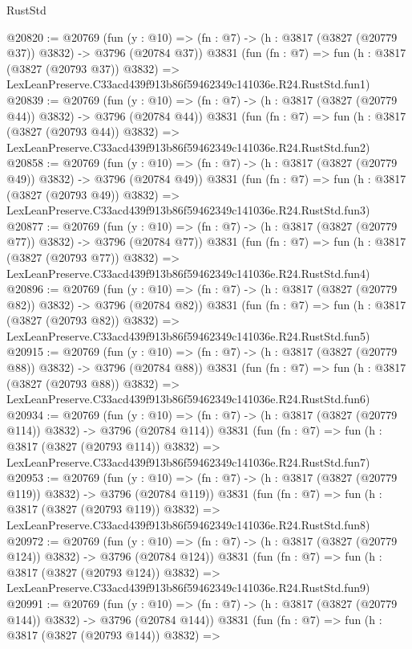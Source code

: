 \begin{lexlean}{RustStd}
\begin{coremodule}
@20820 := @20769
    (fun (y : @10) => (fn : @7) -> (h : @3817 (@3827 (@20779 @37)) @3832) -> @3796 (@20784 @37))
    @3831
    (fun (fn : @7) =>
    fun (h : @3817 (@3827 (@20793 @37)) @3832) =>
    LexLeanPreserve.C33acd439f913b86f59462349c141036e.R24.RustStd.fun1)
@20839 := @20769
    (fun (y : @10) => (fn : @7) -> (h : @3817 (@3827 (@20779 @44)) @3832) -> @3796 (@20784 @44))
    @3831
    (fun (fn : @7) =>
    fun (h : @3817 (@3827 (@20793 @44)) @3832) =>
    LexLeanPreserve.C33acd439f913b86f59462349c141036e.R24.RustStd.fun2)
@20858 := @20769
    (fun (y : @10) => (fn : @7) -> (h : @3817 (@3827 (@20779 @49)) @3832) -> @3796 (@20784 @49))
    @3831
    (fun (fn : @7) =>
    fun (h : @3817 (@3827 (@20793 @49)) @3832) =>
    LexLeanPreserve.C33acd439f913b86f59462349c141036e.R24.RustStd.fun3)
@20877 := @20769
    (fun (y : @10) => (fn : @7) -> (h : @3817 (@3827 (@20779 @77)) @3832) -> @3796 (@20784 @77))
    @3831
    (fun (fn : @7) =>
    fun (h : @3817 (@3827 (@20793 @77)) @3832) =>
    LexLeanPreserve.C33acd439f913b86f59462349c141036e.R24.RustStd.fun4)
@20896 := @20769
    (fun (y : @10) => (fn : @7) -> (h : @3817 (@3827 (@20779 @82)) @3832) -> @3796 (@20784 @82))
    @3831
    (fun (fn : @7) =>
    fun (h : @3817 (@3827 (@20793 @82)) @3832) =>
    LexLeanPreserve.C33acd439f913b86f59462349c141036e.R24.RustStd.fun5)
@20915 := @20769
    (fun (y : @10) => (fn : @7) -> (h : @3817 (@3827 (@20779 @88)) @3832) -> @3796 (@20784 @88))
    @3831
    (fun (fn : @7) =>
    fun (h : @3817 (@3827 (@20793 @88)) @3832) =>
    LexLeanPreserve.C33acd439f913b86f59462349c141036e.R24.RustStd.fun6)
@20934 := @20769
    (fun (y : @10) => (fn : @7) -> (h : @3817 (@3827 (@20779 @114)) @3832) -> @3796 (@20784 @114))
    @3831
    (fun (fn : @7) =>
    fun (h : @3817 (@3827 (@20793 @114)) @3832) =>
    LexLeanPreserve.C33acd439f913b86f59462349c141036e.R24.RustStd.fun7)
@20953 := @20769
    (fun (y : @10) => (fn : @7) -> (h : @3817 (@3827 (@20779 @119)) @3832) -> @3796 (@20784 @119))
    @3831
    (fun (fn : @7) =>
    fun (h : @3817 (@3827 (@20793 @119)) @3832) =>
    LexLeanPreserve.C33acd439f913b86f59462349c141036e.R24.RustStd.fun8)
@20972 := @20769
    (fun (y : @10) => (fn : @7) -> (h : @3817 (@3827 (@20779 @124)) @3832) -> @3796 (@20784 @124))
    @3831
    (fun (fn : @7) =>
    fun (h : @3817 (@3827 (@20793 @124)) @3832) =>
    LexLeanPreserve.C33acd439f913b86f59462349c141036e.R24.RustStd.fun9)
@20991 := @20769
    (fun (y : @10) => (fn : @7) -> (h : @3817 (@3827 (@20779 @144)) @3832) -> @3796 (@20784 @144))
    @3831
    (fun (fn : @7) =>
    fun (h : @3817 (@3827 (@20793 @144)) @3832) =>

\end{coremodule}
\end{lexlean}
